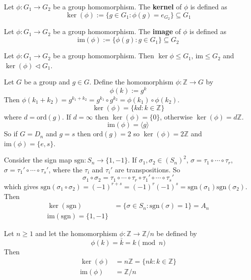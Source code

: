 \begin{definition}
	Let $\phi: G_1 \rightarrow G_2$ be a group homomorphism. The \textbf{kernel} of $\phi$ is defined as
	\[
		\ker(\phi) := \{ g \in G_1: \phi(g) = e_{G_2} \} \subseteq G_1
	\]
\end{definition}

\begin{definition}
	Let $\phi: G_1 \rightarrow G_2$ be a group homomorphism. The \textbf{image} of $\phi$ is defined as
	\[
		\text{im}(\phi) := \{ \phi(g): g \in G_1 \} \subseteq G_2
	\]
\end{definition}

\begin{lemma}
	Let $\phi: G_1 \rightarrow G_2$ be a group homomorphism. Then $\ker{\phi} \le G_1$, $\text{im} \le G_2$ and $\ker(\phi) \triangleleft G_1$.
\end{lemma}

\begin{example}
	Let $G$ be a group and $g \in G$. Define the homomorphism $\phi: \mathbb{Z} \rightarrow G$ by
	\[
		\phi(k) := g^k
	\]
	Then $\phi(k_1 + k_2) = g^{k_1 + k_2} = g^{k_1} \circ g^{k_2} = \phi(k_1) \circ \phi(k_2)$.
	\[
		\ker(\phi) = \{ k d: k \in \mathbb{Z} \}
	\]
	where $d = \text{ord}(g)$. If $d = \infty$ then $\ker(\phi) = \{ 0 \}$, otherwise $\ker(\phi) = d \mathbb{Z}$.
	\[
		\text{im}(\phi) = \langle g \rangle
	\]
	So if $G = D_n$ and $g = s$ then $\text{ord}(g) = 2$ so $\ker(\phi) = 2 \mathbb{Z}$ and $\text{im}(\phi) = \{ e, s \}$.
\end{example}

\begin{example}
	Consider the sign map $\text{sgn}: S_n \rightarrow \{ 1, -1 \}$. If $\sigma_1, \sigma_2 \in {(S_n)}^2$, $\sigma = \tau_1 \circ \cdots \circ \tau_r$, $\sigma = \tau_1' \circ \cdots \circ \tau_s'$, where the $\tau_i$ and $\tau_i'$ are transpositions. So
	\[
		\sigma_1 \circ \sigma_2 = \tau_1 \circ \cdots \circ \tau_r \circ \tau_1' \circ \cdots \circ \tau_s'
	\]
	which gives $\text{sgn}(\sigma_1 \circ \sigma_2) = {(-1)}^{r + s} = {(-1)}^r {(-1)}^s = \text{sgn}(\sigma_1) \text{sgn}(\sigma_2)$.
	Then
	\[
		\begin{aligned}
			\ker(\text{sgn}) & = \{ \sigma \in S_n: \text{sgn}(\sigma) = 1 \} = A_n \\
			\text{im}(\text{sgn}) = \{ 1, -1 \}
		\end{aligned}
	\]
\end{example}

\begin{example}
	Let $n \ge 1$ and let the homomorphism $\phi: \mathbb{Z} \rightarrow \mathbb{Z} / n$ be defined by
	\[
		\phi(k) = \bar{k} = k \pmod{n}
	\]
	Then
	\[
		\begin{aligned}
			\ker(\phi) & = n \mathbb{Z} = \{ n k: k \in \mathbb{Z} \} \\
			\text{im}(\phi) & = \mathbb{Z} / n
		\end{aligned}
	\]
\end{example}

